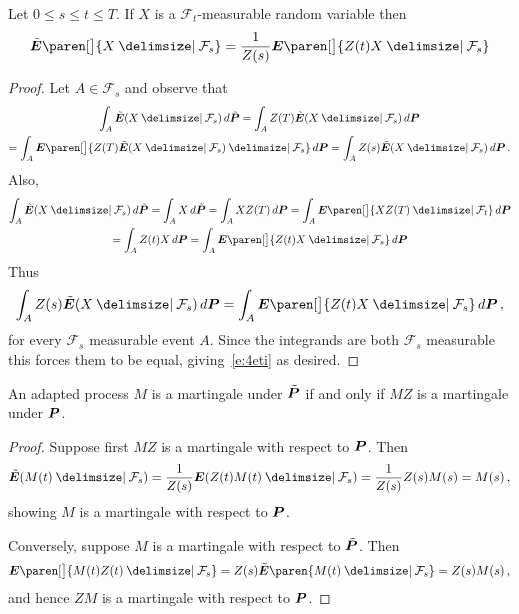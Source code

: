 \begin{lemma}
  Let $0 \leq s \leq t \leq T$.
  If $X$ is a $\mathcal F_t$-measurable random variable then
  \begin{equation}\label{e:4eti}
    \tilde\E\paren[\big]{ X \given \mathcal F_s }
      = \frac{1}{Z(s)} \E \paren[\big]{ Z(t) X \given \mathcal F_s }
  \end{equation}
\end{lemma}
\begin{proof}
  Let $A \in \mathcal F_s$ and observe that
  \begin{multline*}
    \int_A \tilde\E( X \given \mathcal F_s ) \, d\tilde\P
      = \int_A Z(T) \tilde\E( X \given \mathcal F_s ) \, d\P
    \\
      = \int_A \E\paren[\big]{
	  Z(T) \tilde\E( X \given \mathcal F_s ) \given \mathcal F_s} \, d\P
      = \int_A Z(s) \tilde\E( X \given \mathcal F_s )\, d\P\,.
  \end{multline*}
  Also,
  \begin{multline*}
    \int_A \tilde\E( X \given \mathcal F_s ) \, d\tilde\P
      = \int_A X \, d\tilde \P
      = \int_A X Z(T) \, d\P
      = \int_A \E\paren[\big]{ X Z(T) \given \mathcal F_t } \, d\P
  \\
      = \int_A Z(t) X \, d\P
      = \int_A \E\paren[\big]{ Z(t) X \given \mathcal F_s} \, d\P
  \end{multline*}
  Thus 
  \begin{equation*}
    \int_A Z(s) \tilde\E( X \given \mathcal F_s )\, d\P
      = \int_A \E\paren[\big]{ Z(t) X \given \mathcal F_s} \, d\P\,,
  \end{equation*}
  for every $\mathcal F_s$ measurable event $A$.
  Since the integrands are both $\mathcal F_s$ measurable this forces them to be equal, giving~\eqref{e:4eti} as desired.
\end{proof}

\begin{lemma}\label{l:4pmg}
  An adapted process $M$ is a martingale under $\tilde\P$ if and only if $MZ$ is a martingale under $\P$.
\end{lemma}
\begin{proof}
  Suppose first $MZ$ is a martingale with respect to $\P$.
  Then
  \begin{equation*}
    \tilde\E( M(t) \given \mathcal F_s )
      = \frac{1}{Z(s)} \E( Z(t) M(t) \given \mathcal F_s )
      = \frac{1}{Z(s)} Z(s) M(s) = M(s)\,,
  \end{equation*}
  showing $M$ is a martingale with respect to $\P$.

  Conversely, suppose $M$ is a martingale with respect to $\tilde\P$.
  Then
  \begin{equation*}
    \E\paren[\big]{ M(t) Z(t) \given \mathcal F_s }
      = Z(s) \tilde\E\paren{ M(t) \given \mathcal F_s }
      = Z(s) M(s)\,,
  \end{equation*}
  and hence $ZM$ is a martingale with respect to $\P$.
\end{proof}

